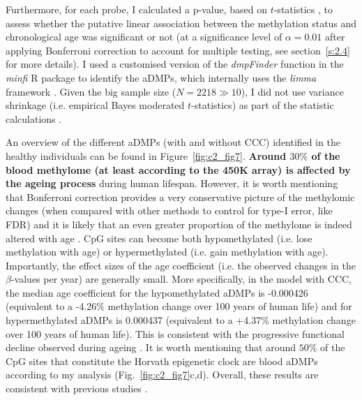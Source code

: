 Furthermore, for each probe, I calculated a p-value, based on $t$-statistics \citep{Teschendorff2018}, to assess whether the putative linear association between the methylation status and chronological age was significant or not (at a significance level of $\alpha=0.01$ after applying Bonferroni correction to account for multiple testing, see section~\ref{s:2.4} for more details). I used a customised version of the \textit{dmpFinder} function in the \textit{minfi} R package \citep{Aryee2014} to identify the aDMPs, which internally uses the \textit{limma} framework \citep{Ritchie2015}. Given the big sample size ($N = 2218 \gg 10$), I did not use variance shrinkage (i.e. empirical Bayes moderated $t$-statistics) as part of the statistic calculations \citep{Ritchie2015}.  

\bigskip

An overview of the different aDMPs (with and without CCC) identified in the healthy individuals can be found in Figure~\ref{fig:c2_fig7}. \textbf{Around $30\%$ of the blood methylome (at least according to the 450K array) is affected by the ageing process} during human lifespan. However, it is worth mentioning that Bonferroni correction provides a very conservative picture of the methylomic changes (when compared with other methods to control for type-I error, like \acrshort{FDR}) and it is likely that an even greater proportion of the methylome is indeed altered with age \citep{Zhu2018}. CpG sites can become both hypomethylated (i.e. lose methylation with age) or hypermethylated (i.e. gain methylation with age). Importantly, the effect sizes of the age coefficient (i.e. the observed changes in the $\beta$-values per year) are generally small. More specifically, in the model with CCC, the median age coefficient for the hypomethylated aDMPs is -0.000426 (equivalent to a -4.26\% methylation change over 100 years of human life) and for hypermethylated aDMPs is 0.000437 (equivalent to a +4.37\% methylation change over 100 years of human life). This is consistent with the progressive functional decline observed during ageing \citep{Lopez-Otin2013}. It is worth mentioning that around $50\%$ of the CpG sites that constitute the Horvath epigenetic clock are blood aDMPs according to my analysis (Fig.~\ref{fig:c2_fig7}c,d). Overall, these results are consistent with previous studies \citep{Slieker2016,Slieker2018,Zhu2018,VanDongen2016}. 

